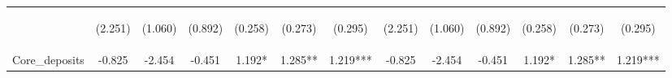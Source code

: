 \documentclass[]{article}
\begin{document}
\begin{center}
\begin{tabular}{lcccccccccccc}
\vspace{4pt} & \begin{footnotesize}(2.251)\end{footnotesize} & \begin{footnotesize}(1.060)\end{footnotesize} & \begin{footnotesize}(0.892)\end{footnotesize} & \begin{footnotesize}(0.258)\end{footnotesize} & \begin{footnotesize}(0.273)\end{footnotesize} & \begin{footnotesize}(0.295)\end{footnotesize} & \begin{footnotesize}(2.251)\end{footnotesize} & \begin{footnotesize}(1.060)\end{footnotesize} & \begin{footnotesize}(0.892)\end{footnotesize} & \begin{footnotesize}(0.258)\end{footnotesize} & \begin{footnotesize}(0.273)\end{footnotesize} & \begin{footnotesize}(0.295)\end{footnotesize} \\
Core\_deposits & -0.825 & -2.454 & -0.451 & 1.192* & 1.285** & 1.219*** & -0.825 & -2.454 & -0.451 & 1.192* & 1.285** & 1.219*** \\

\end{tabular}
\end{center}
\end{document}

